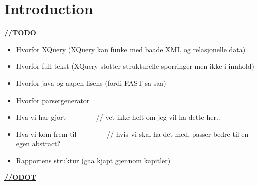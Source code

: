 \chapter{Introduction}
\underline{\textbf{\LARGE //TODO}}

\begin{itemize}
\item Hvorfor XQuery (XQuery kan funke med baade XML og relasjonelle data)
\item Hvorfor full-tekst (XQuery stotter strukturelle sporringer men ikke i innhold)
\item Hvorfor java og aapen lisens (fordi FAST sa saa)
\item Hvorfor parsergenerator
\item Hva vi har gjort     ~~~~~~~~// vet ikke helt om jeg vil ha dette her.. 
\item Hva vi kom frem til  ~~~~~~~~// hvis vi skal ha det med, passer bedre til en egen abstract?
\item Rapportens struktur (gaa kjapt gjennom kapitler)
\end{itemize}

\underline{\textbf{\LARGE //ODOT}}